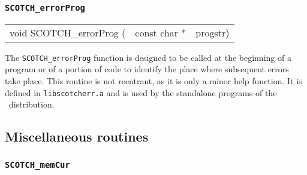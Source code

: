 \subsubsection{{\tt SCOTCH\_errorProg}}

\begin{itemize}
\progsyn

{\tt\begin{tabular}{l@{}ll}
void SCOTCH\_errorProg ( & const char * & progstr)
\end{tabular}}

\progdes

The {\tt SCOTCH\_errorProg} function is designed to be called at
the beginning of a program or of a portion of code to identify the
place where subsequent errors take place.
This routine is not reentrant, as it is only a minor help function. It
is defined in {\tt lib\lbt scotch\lbt err.a} and is used by the
standalone programs of the \scotch\ distribution.
\end{itemize}

\subsection{Miscellaneous routines}
\label{sec-lib-misc}

\subsubsection{{\tt SCOTCH\_memCur}}


